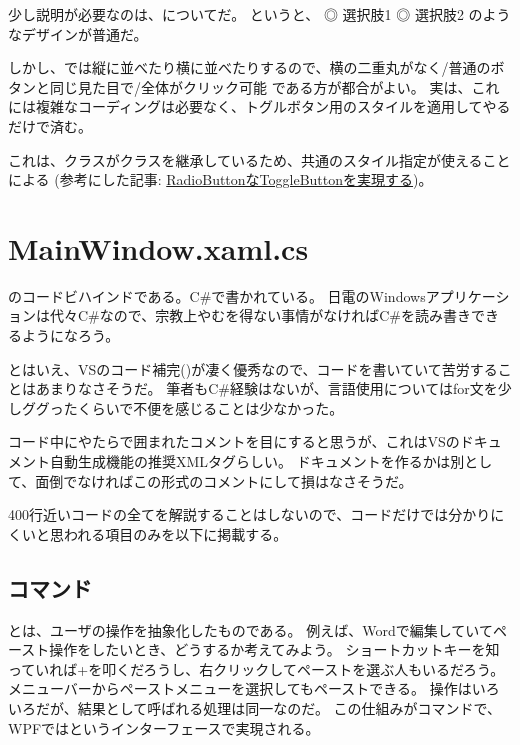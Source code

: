 \documentclass[letterpaper,10pt,dvipdfmx]{sphinxmanual}
\begin{document}
少し説明が必要なのは、についてだ。
 というと、
◎ 選択肢1
◎ 選択肢2
のようなデザインが普通だ。

しかし、では縦に並べたり横に並べたりするので、横の二重丸がなく/普通のボタンと同じ見た目で/全体がクリック可能 である方が都合がよい。
実は、これには複雑なコーディングは必要なく、トグルボタン用のスタイルを適用してやるだけで済む。

\begin{sphinxVerbatim}[commandchars=\\\{\}]
  
\end{sphinxVerbatim}

これは、クラスがクラスを継承しているため、共通のスタイル指定が使えることによる
(参考にした記事: \href{http://neareal.net/index.php?Programming\%2F.NetFramework\%2FWPF\%2FRadioToggleButton}{RadioButtonなToggleButtonを実現する})。


\section{MainWindow.xaml.cs}
\label{\detokenize{nissyu-idohen/pc-software-code:mainwindow-xaml-cs}}
のコードビハインドである。C\#で書かれている。
日電のWindowsアプリケーションは代々C\#なので、宗教上やむを得ない事情がなければC\#を読み書きできるようになろう。

とはいえ、VSのコード補完()が凄く優秀なので、コードを書いていて苦労することはあまりなさそうだ。
筆者もC\#経験はないが、言語使用についてはfor文を少しググったくらいで不便を感じることは少なかった。

コード中にやたらで囲まれたコメントを目にすると思うが、これはVSのドキュメント自動生成機能の推奨XMLタグらしい。
ドキュメントを作るかは別として、面倒でなければこの形式のコメントにして損はなさそうだ。

400行近いコードの全てを解説することはしないので、コードだけでは分かりにくいと思われる項目のみを以下に掲載する。


\subsection{コマンド}
\label{\detokenize{nissyu-idohen/pc-software-code:}}\label{\detokenize{nissyu-idohen/pc-software-code:id9}}
 とは、ユーザの操作を抽象化したものである。
例えば、Wordで編集していてペースト操作をしたいとき、どうするか考えてみよう。
ショートカットキーを知っていれば+を叩くだろうし、右クリックしてペーストを選ぶ人もいるだろう。
メニューバーからペーストメニューを選択してもペーストできる。
操作はいろいろだが、結果として呼ばれる処理は同一なのだ。
この仕組みがコマンドで、WPFではというインターフェースで実現される。
\end{document}
